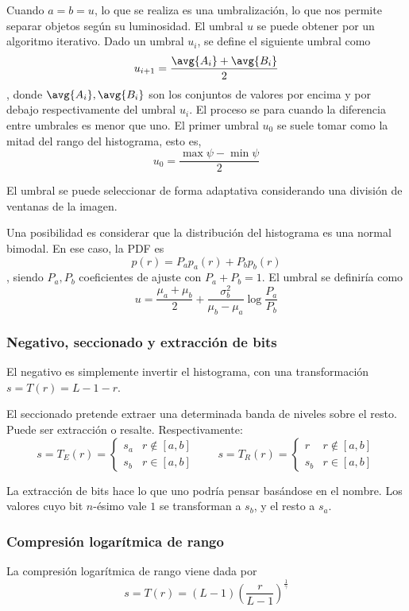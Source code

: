 \documentclass[nochap,palatino,notitlepage]{apuntes}
\begin{document}
Cuando $a = b = u$, lo que se realiza es una umbralización, lo que nos permite separar objetos según su luminosidad. El umbral $u$ se puede obtener por un algoritmo iterativo. Dado un umbral $u_i$, se define el siguiente umbral como \[ u_{i + 1} = \frac{\avg{A_i} + \avg{B_i}}{2}\], donde $\avg{A_i}, \avg{B_i}$ son los conjuntos de valores por encima y por debajo respectivamente del umbral $u_i$. El proceso se para cuando la diferencia entre umbrales es menor que uno. El primer umbral $u_0$ se suele tomar como la mitad del rango del histograma, esto es, \[ u_0 = \frac{\max ψ - \min ψ}{2} \]

El umbral se puede seleccionar de forma adaptativa considerando una división de ventanas de la imagen.

Una posibilidad es considerar que la distribución del histograma es una normal bimodal. En ese caso, la PDF es \[ p(r) = P_a p_a(r) + P_b p_b(r) \], siendo $P_a, P_b$ coeficientes de ajuste con $P_a + P_b = 1$. El umbral se definiría como \[ u = \frac{μ_a + μ_b}{2} + \frac{σ_b^2}{μ_b - μ_a} \log \frac{P_a}{P_b} \]

\subsubsection{Negativo, seccionado y extracción de bits}

El negativo es simplemente invertir el histograma, con una transformación $s = T(r) = L - 1 - r$.

El seccionado pretende extraer una determinada banda de niveles sobre el resto. Puede ser extracción o resalte. Respectivamente: \[ s = T_E(r) =
\begin{cases}
s_a & r ∉ [a,b] \\
s_b & r ∈ [a,b]
\end{cases} \qquad
s=T_R(r) = \begin{cases}
r & r ∉ [a,b] \\
s_b & r ∈ [a,b]
\end{cases}
\]

La extracción de bits hace lo que uno podría pensar basándose en el nombre. Los valores cuyo bit $n$-ésimo vale $1$ se transforman a $s_b$, y el resto a $s_a$.

\subsubsection{Compresión logarítmica de rango}

La compresión logarítmica de rango viene dada por \[ s = T(r) = (L - 1) \left(\frac{r}{L - 1}\right)^{\frac{1}{γ}} \]
\end{document}
